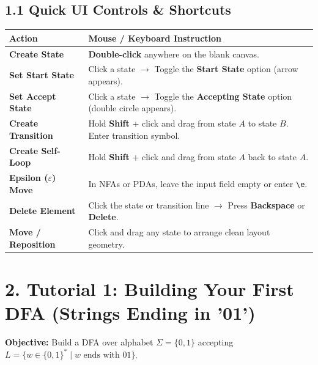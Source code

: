\documentclass[11pt,a4paper]{article}
\begin{document}
\subsection*{1.1 Quick UI Controls \& Shortcuts}
\begin{center}
\begin{tabularx}{\textwidth}{l X}
    \toprule
    \textbf{Action} & \textbf{Mouse / Keyboard Instruction} \\
    \midrule
    \textbf{Create State} & \textbf{Double-click} anywhere on the blank canvas. \\
    \textbf{Set Start State} & Click a state $\to$ Toggle the \textbf{Start State} option (arrow appears). \\
    \textbf{Set Accept State} & Click a state $\to$ Toggle the \textbf{Accepting State} option (double circle appears). \\
    \textbf{Create Transition} & Hold \textbf{Shift} + click and drag from state $A$ to state $B$. Enter transition symbol. \\
    \textbf{Create Self-Loop} & Hold \textbf{Shift} + click and drag from state $A$ back to state $A$. \\
    \textbf{Epsilon ($\varepsilon$) Move} & In NFAs or PDAs, leave the input field empty or enter \texttt{\textbackslash e}. \\
    \textbf{Delete Element} & Click the state or transition line $\to$ Press \textbf{Backspace} or \textbf{Delete}. \\
    \textbf{Move / Reposition} & Click and drag any state to arrange clean layout geometry. \\
    \bottomrule
\end{tabularx}
\end{center}

\vspace{8pt}

\section*{2. Tutorial 1: Building Your First DFA (Strings Ending in '01')}
\textbf{Objective:} Build a DFA over alphabet $\Sigma = \{0, 1\}$ accepting $L = \{w \in \{0, 1\}^* \mid w \text{ ends with } 01\}$.
\end{document}
